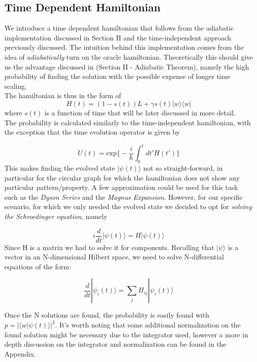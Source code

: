 \documentclass[aps,pra,reprint, onecolumn]{revtex4-2}
\begin{document}
\subsection{Time Dependent Hamiltonian}
We introduce a time dependent hamiltonian that follows from the adiabatic implementation discussed in Section II and the time-independent approach previously discussed. The intuition behind this implementation comes from the idea of \textit{adiabatically} turn on the oracle hamiltonian. Theoretically this should give us the advantage discussed in (Section II - Adiabatic Theorem), namely the high probability of finding the solution with the possible expense of longer time scaling. \\
The hamiltonian is thus in the form of
\begin{equation}
H(t) = (1-s(t))L + \gamma s(t)|w\rangle\langle w|
\end{equation}
where $s(t)$ is a function of time that will be later discussed in more detail. \\

The probability is calculated similarly to the time-independent hamiltonian, with the exception that the time evolution operator is given by

\begin{equation}
U(t) = \mbox{exp} \Big\{ -\frac{i}{\hbar} \int_{0}^{t}dt'H(t') \Big\}
\end{equation}
This makes finding the evolved state $|\psi(t)\rangle$ not so straight-forward, in particular for the circular graph for which the hamiltonian does not show any particular pattern/property. A few approximation could be used for this task such as the \textit{Dyson Series} and the \textit{Magnus Expansion}. However, for our specific scenario, for which we only needed the evolved state we decided to opt for \textit{solving the Schroedinger equation}, namely

\begin{equation}
  i\frac{d}{dt}|\psi(t)\rangle = H |\psi(t)\rangle
\end{equation}
Since H is a matrix we had to solve it for components. Recalling that $|\psi\rangle$ is a vector in an N-dimensional Hilbert space, we need to solve N-differential equations of the form:

\begin{equation}
\frac{d}{dt}|\psi_i(t)\rangle = \sum_jH_{ij}|\psi_i(t)\rangle
\end{equation}

Once the N solutions are found, the probability is easily found with $p=|\langle w |\psi(t)\rangle|^2$. It's worth noting that some additional normalization on the found solution might be necessary due to the integrator used, however a more in depth discussion on the integrator and normalization can be found in the Appendix.
\end{document}
